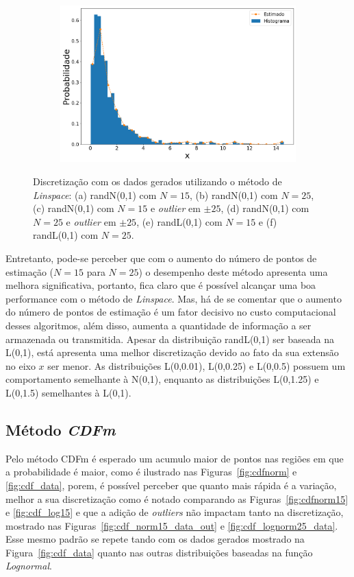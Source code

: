 \begin{figure}[H]
\begin{subfigure}[b]{0.45\textwidth}
		\includegraphics[width=\linewidth]{./figuras/Linspace_lognormal_25_1000}
		\caption{}
		\label{fig:lin_lognorm25_data}
	\end{subfigure}
	\caption{Discretização com os dados gerados utilizando o método de \textit{Linspace}: (a) randN(0,1) com $N = 15$, (b) randN(0,1) com $N = 25$, (c) randN(0,1) com $N = 15$ e \textit{outlier} em $\pm 25$, (d) randN(0,1) com $N = 25$ e \textit{outlier} em $\pm 25$, (e) randL(0,1) com $ N = 15 $ e (f) randL(0,1) com $ N = 25 $.}
	\label{fig:lin_data}
\end{figure}

Entretanto, pode-se perceber que com o aumento do número de pontos de estimação ($N = 15$ para $N = 25$) o desempenho deste método apresenta uma melhora significativa, portanto, fica claro que é possível alcançar uma boa performance com o método de \textit{Linspace}. Mas, há de se comentar que o aumento do número de pontos de estimação é um fator decisivo no custo computacional desses algoritmos, além disso, aumenta a quantidade de informação a ser armazenada ou transmitida. Apesar da distribuição randL(0,1) ser baseada na L(0,1), está apresenta uma melhor discretização devido ao fato da sua extensão no eixo $ x $ ser menor. As distribuições L(0,0.01), L(0,0.25) e L(0,0.5) possuem um comportamento semelhante à N(0,1), enquanto as distribuições L(0,1.25) e L(0,1.5) semelhantes à L(0,1).%

\subsection{Método \textit{CDFm}}

Pelo método \ac{CDFm} é esperado um acumulo maior de pontos nas regiões em que a probabilidade é maior, como é ilustrado nas Figuras~\ref{fig:cdfnorm} e \ref{fig:cdf_data}, porem, é possível perceber que quanto mais rápida é a variação, melhor a sua discretização como é notado comparando as Figuras~\ref{fig:cdfnorm15} e \ref{fig:cdf_log15} e que a adição de \textit{outliers} não impactam tanto na discretização, mostrado nas Figuras~\ref{fig:cdf_norm15_data_out} e \ref{fig:cdf_lognorm25_data}. Esse mesmo padrão se repete tando com os dados gerados mostrado na Figura~\ref{fig:cdf_data} quanto nas outras distribuições baseadas na função \textit{Lognormal}.%

